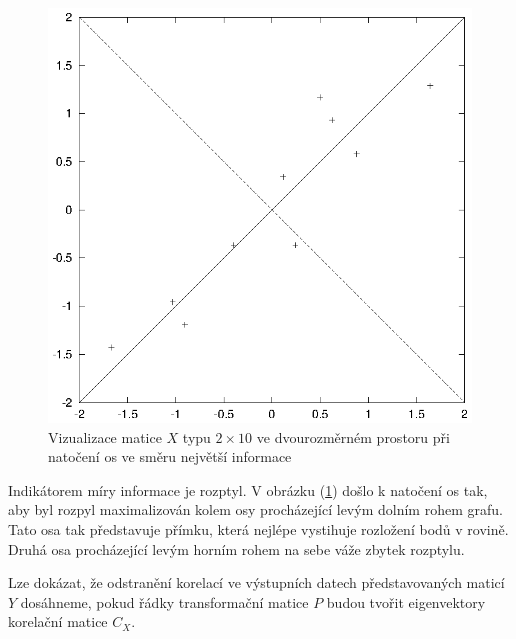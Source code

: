 \documentclass[a4paper]{book}
\begin{document}
\begin{figure}
  \centering
  \includegraphics{data_adj_axis.eps}
  \caption{Vizualizace matice $X$ typu $2 \times 10$ ve dvourozměrném prostoru při natočení os ve směru největší informace}
  \label{data_adj_axis}
\end{figure}
Indikátorem míry informace je rozptyl. V obrázku (\ref{data_adj_axis}) došlo k natočení os tak, aby byl rozpyl maximalizován kolem osy procházející levým dolním rohem grafu. Tato osa tak představuje přímku, která nejlépe vystihuje rozložení bodů v rovině. Druhá osa procházející levým horním rohem na sebe váže zbytek rozptylu. 


Lze dokázat, že odstranění korelací ve výstupních datech představovaných maticí $Y$ dosáhneme, pokud řádky transformační matice $P$ budou tvořit eigenvektory korelační matice $C_X$.
\end{document}
